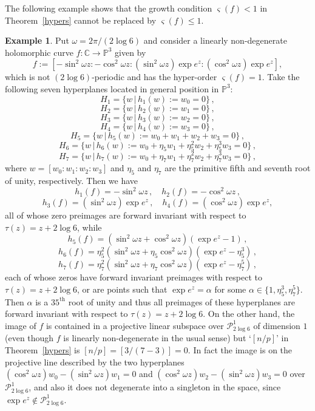 \documentclass{amsart}
\theoremstyle{definition}
\newtheorem{example}[theorem]{Example}
\numberwithin{equation}{section}
\numberwithin{theorem}{section}
\begin{document}
The following example shows that the growth condition $\varsigma(f)<1$ in Theorem~\ref{hypers} cannot be replaced by $\varsigma(f)\leq1$.

\begin{example}
Put $\omega=2\pi /(2\log 6)$ and consider a linearly non-degenerate holomorphic curve $f:\mathbb{C}\to\mathbb{P}^3$ given by
$$
f:=[-\sin^2 \omega z: -\cos^2 \omega z: (\sin^2 \omega z) \exp e^z : (\cos^2 \omega z) \exp e^z],
$$
which is not $(2\log 6)$-periodic and has the hyper-order $\varsigma(f)=1$.
Take the following seven hyperplanes located in general position in $\mathbb{P}^3$:
$$
H_1=\{w\, |\, h_1(w):=w_0=0\}\,,
$$
$$
H_2=\{w\, |\, h_2(w):=w_1=0\}\,,
$$
$$
H_3=\{w\, |\, h_3(w):=w_2=0\}\,,
$$
$$
H_4=\{w\, |\, h_4(w):=w_3=0\}\,,
$$
$$
H_5=\{w\, |\, h_5(w):=w_0+w_1+w_2+w_3=0\}\,,
$$
$$
H_6=\{w\, |\, h_6(w):=w_0+\eta_5w_1+\eta_5^2w_2+\eta_5^3w_3=0\}\,,
$$
$$
H_7=\{w\, |\, h_7(w):=w_0+\eta_7w_1+\eta_7^2w_2+\eta_7^3w_3=0\}\,,
$$
where $w=[w_0:w_1:w_2:w_3]$ and $\eta_5$ and $\eta_7$ are the primitive fifth and seventh root of unity,
respectively.
Then we have
$$
h_1(f)= -\sin^2 \omega z\,, \quad h_2(f)= -\cos^2 \omega z\,,
$$
$$
h_3(f)= (\sin^2 \omega z) \exp e^z\,, \quad h_4(f)= (\cos^2 \omega z) \exp e^z,
$$
all of whose zero preimages are forward invariant with respect to $\tau(z)=z+2\log 6$, while
$$
h_5(f)= (\sin^2 \omega z + \cos^2 \omega z ) (\exp e^z-1) \,,
$$
$$
h_6(f)= \eta_5^2(\sin^2 \omega z + \eta_5 \cos^2 \omega z ) (\exp e^z - \eta_5^3) \,,
$$
$$
h_7(f)= \eta_7^2(\sin^2 \omega z + \eta_7 \cos^2 \omega z ) (\exp e^z - \eta_7^5) \,,
$$
each of whose zeros have forward invariant preimages with respect to $\tau(z)=z+2\log 6$, or are points such that $\exp e^z =\alpha$ for some $\alpha\in\{1,\eta_5^3, \eta_7^5\}$.
Then $\alpha$ is a $35^\textrm{th}$ root of unity and thus all preimages of these hyperplanes are forward invariant with respect to $\tau(z)=z+2\log 6$. On the other hand, the image of $f$ is contained in a projective linear subspace over $\mathcal{P}_{2\log6}^1$ of dimension $1$ (even though $f$ is linearly non-degenerate in the usual sense) but `$[n/p]$' in Theorem~\ref{hypers} is $[n/p]=[3/(7-3)]=0$. In fact the image is on the projective line described by the two hyperplanes
$(\cos^2\omega z)w_0-(\sin^2\omega z)w_1=0$ and $(\cos^2\omega z)w_2-(\sin^2\omega z)w_3=0$
over $\mathcal{P}_{2\log6}^1$, and also it does not degenerate into a singleton in the space, since $\exp e^z \not\in \mathcal{P}_{2\log6}^1$.
\end{example}
\end{document}
